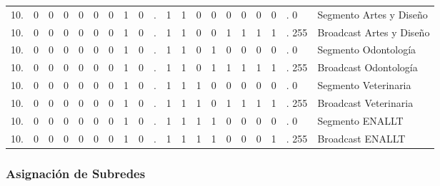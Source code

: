 \begin{center}
{\begin{tabular}{r cccccccc c cccccccc l l}
10. & 0 & 0 & 0 & 0 & 0 & 0 & 1 & 0 & . & 1 & 1 & 0 & \multicolumn{1}{c|}{0} & 0 & 0 & 0 & 0 & . 0 & Segmento Artes y Diseño \\
10. & 0 & 0 & 0 & 0 & 0 & 0 & 1 & 0 & . & 1 & 1 & 0 & \multicolumn{1}{c|}{0} & 1 & 1 & 1 & 1 & . 255 & Broadcast Artes y Diseño \\
\addlinespace

10. & 0 & 0 & 0 & 0 & 0 & 0 & 1 & 0 & . & 1 & 1 & 0 & \multicolumn{1}{c|}{1} & 0 & 0 & 0 & 0 & . 0 & Segmento Odontología \\
10. & 0 & 0 & 0 & 0 & 0 & 0 & 1 & 0 & . & 1 & 1 & 0 & \multicolumn{1}{c|}{1} & 1 & 1 & 1 & 1 & . 255 & Broadcast Odontología \\
\addlinespace

10. & 0 & 0 & 0 & 0 & 0 & 0 & 1 & 0 & . & 1 & 1 & 1 & \multicolumn{1}{c|}{0} & 0 & 0 & 0 & 0 & . 0 & Segmento Veterinaria \\
10. & 0 & 0 & 0 & 0 & 0 & 0 & 1 & 0 & . & 1 & 1 & 1 & \multicolumn{1}{c|}{0} & 1 & 1 & 1 & 1 & . 255 & Broadcast Veterinaria \\
\addlinespace

10. & 0 & 0 & 0 & 0 & 0 & 0 & 1 & 0 & . & 1 & 1 & 1 & 1 & 0 & 0 & \multicolumn{1}{c|}{0} & 0 & . 0 & Segmento ENALLT \\
10. & 0 & 0 & 0 & 0 & 0 & 0 & 1 & 0 & . & 1 & 1 & 1 & 1 & 0 & 0 & \multicolumn{1}{c|}{0} & 1 & . 255 & Broadcast ENALLT \\
\bottomrule
\end{tabular}
}
\end{center}
\vspace{15pt}

\subsubsection*{Asignación de Subredes}

